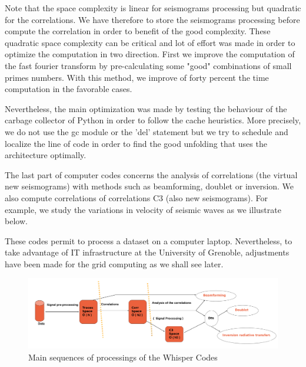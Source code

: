 \documentclass[a4paper, 10pt]{article}
\begin{document}
\begin{multicols}{2}
Note that the space complexity is linear for seismograms processing but quadratic for the correlations. We have therefore to store the seismograms processing before compute the correlation in order to benefit of the good complexity.
These quadratic space complexity can be critical and lot of effort was made in order to optimize the computation in two direction. First we improve the computation of the fast fourier transform by pre-calculating some "good" combinations of small primes numbers. 
With this method, we improve of forty percent the time computation in the favorable cases.

Nevertheless, the main optimization was made by testing the behaviour of the carbage collector of Python in order to follow the cache heuristics. More precisely, we do not use the gc module or the 'del' statement but we try to schedule and localize the line of code in order to find the good unfolding that uses the architecture optimally.

The last part of computer codes concerns the analysis of correlations (the virtual new seismograms) with methods such as beamforming, doublet or inversion.
We also compute correlations of correlations C3 (also new seismograms). For example, we study the variations
in velocity of seismic waves as we illustrate below. 

These codes permit to process a dataset on a computer laptop. 
Nevertheless, to take advantage of IT infrastructure at the University of Grenoble, 
adjustments have been made for the grid computing as we shall see later.

\end{multicols}
\begin{figure}[h]
\centering
\caption{\label{whisperGeneralWorflow} Main sequences of processings of the Whisper Codes}
\includegraphics[width=16cm]{briandPosterAGU2013GimpProcessing.png}
\end{figure}
\end{document}
